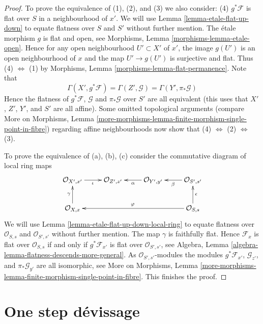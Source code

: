 \begin{proof}
To prove the equivalence of (1), (2), and (3) we also consider:
(4) $g^*\mathcal{F}$ is flat over $S$ in a neighbourhood of $x'$.
We will use
Lemma \ref{lemma-etale-flat-up-down}
to equate flatness over $S$ and $S'$ without further mention.
The \'etale morphism $g$ is flat and open, see
Morphisms, Lemma \ref{morphisms-lemma-etale-open}.
Hence for any open neighbourhood $U' \subset X'$ of $x'$, the image
$g(U')$ is an open neighbourhood of $x$ and the map
$U' \to g(U')$ is surjective and flat.
Thus (4) $\Leftrightarrow$ (1) by
Morphisms, Lemma \ref{morphisms-lemma-flat-permanence}.
Note that
$$
\Gamma(X', g^*\mathcal{F}) =
\Gamma(Z', \mathcal{G}) =
\Gamma(Y', \pi_*\mathcal{G})
$$
Hence the flatness of $g^*\mathcal{F}$, $\mathcal{G}$ and $\pi_*\mathcal{G}$
over $S'$ are all equivalent (this uses that $X'$, $Z'$, $Y'$, and
$S'$ are all affine). Some omitted topological arguments (compare
More on Morphisms,
Lemma \ref{more-morphisms-lemma-finite-morphism-single-point-in-fibre})
regarding affine neighbourhoods now show that
(4) $\Leftrightarrow$ (2) $\Leftrightarrow$ (3).

\medskip\noindent
To prove the equivalence of (a), (b), (c) consider the commutative diagram
of local ring maps
$$
\xymatrix{
\mathcal{O}_{X', x'} \ar[r]_\iota &
\mathcal{O}_{Z', z'} &
\mathcal{O}_{Y', y'} \ar[l]^\alpha &
\mathcal{O}_{S', s'} \ar[l]^\beta \\
\mathcal{O}_{X, x} \ar[u]^\gamma & & &
\mathcal{O}_{S, s} \ar[lll]_\varphi \ar[u]_\epsilon
}
$$
We will use
Lemma \ref{lemma-etale-flat-up-down-local-ring}
to equate flatness over $\mathcal{O}_{S, s}$ and $\mathcal{O}_{S', s'}$
without further mention.
The map $\gamma$ is faithfully flat. Hence
$\mathcal{F}_x$ is flat over $\mathcal{O}_{S, s}$
if and only if $g^*\mathcal{F}_{x'}$ is flat over
$\mathcal{O}_{S', s'}$, see
Algebra, Lemma \ref{algebra-lemma-flatness-descends-more-general}.
As $\mathcal{O}_{S', s'}$-modules the modules
$g^*\mathcal{F}_{x'}$, $\mathcal{G}_{z'}$, and
$\pi_*\mathcal{G}_{y'}$ are all isomorphic, see
More on Morphisms,
Lemma \ref{more-morphisms-lemma-finite-morphism-single-point-in-fibre}.
This finishes the proof.
\end{proof}









\section{One step d\'evissage}
\label{section-one-step-devissage}

